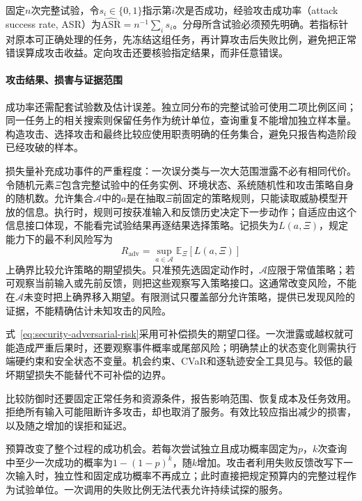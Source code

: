 固定$n$次完整试验，令$s_i\in\{0,1\}$指示第$i$次是否成功，经验攻击成功率（attack success rate, ASR）为$\widehat{\mathrm{ASR}}=n^{-1}\sum_i s_i$。分母所含试验必须预先明确。若指标针对原本可正确处理的任务，先冻结这组任务，再计算攻击后失败比例，避免把正常错误算成攻击收益。定向攻击还要核验指定结果，而非任意错误。

\paragraph{攻击结果、损害与证据范围}

成功率还需配套试验数及估计误差。独立同分布的完整试验可使用二项比例区间；同一任务上的相关搜索则保留任务作为统计单位，查询重复不能增加独立样本量。构造攻击、选择攻击和最终比较应使用职责明确的任务集合，避免只报告构造阶段已经攻破的样本。

损失量补充成功事件的严重程度：一次误分类与一次大范围泄露不必有相同代价。令随机元素$\Xi$包含完整试验中的任务实例、环境状态、系统随机性和攻击策略自身的随机数。允许集合$\mathcal A$中的$a$是在抽取$\Xi$前固定的策略规则，只能读取威胁模型开放的信息。执行时，规则可按获准输入和反馈历史决定下一步动作；自适应由这个信息接口体现，不能看完试验结果再逐结果选择策略。记损失为$L(a,\Xi)$，规定能力下的最不利风险写为
\begin{equation}
 R_{\mathrm{adv}}=\sup_{a\in\mathcal A}
 \mathbb E_{\Xi}[L(a,\Xi)]
 \label{eq:security-adversarial-risk}
\end{equation}
上确界比较允许策略的期望损失。只准预先选固定动作时，$\mathcal A$应限于常值策略；若可观察当前输入或先前反馈，则把这些观察写入策略接口。这通常改变风险，不能在$\mathcal A$未变时把上确界移入期望。有限测试只覆盖部分允许策略，提供已发现风险的证据，不能精确估计未知攻击的风险。

式~\eqref{eq:security-adversarial-risk}采用可补偿损失的期望口径。一次泄露或越权就可能造成严重后果时，还要观察事件概率或尾部风险；明确禁止的状态变化则需执行端硬约束和安全状态不变量。机会约束、CVaR和逐轨迹安全工具见与。较低的最坏期望损失不能替代不可补偿的边界。

比较防御时还要固定正常任务和资源条件，报告影响范围、恢复成本及任务效用。拒绝所有输入可能阻断许多攻击，却也取消了服务。有效比较应指出减少的损害，以及随之增加的误拒和延迟。

预算改变了整个过程的成功机会。若每次尝试独立且成功概率固定为$p$，$k$次查询中至少一次成功的概率为$1-(1-p)^k$，随$k$增加。攻击者利用失败反馈改写下一次输入时，独立性和固定成功概率不再成立；此时直接把规定预算内的完整过程作为试验单位。一次调用的失败比例无法代表允许持续试探的服务。

